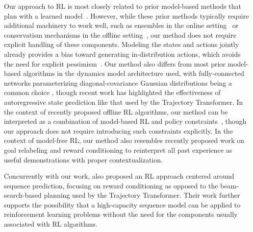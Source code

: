 Our approach to RL is most closely related to prior model-based methods that plan with a learned model~\citep{chua2018pets,wang2019exploring}.
However, while these prior methods typically require additional machinery to work well, such as ensembles in the online setting~\citep{kurutach2018model,buckman2018sample,malik2019calibrated} or conservatism mechanisms in the offline setting~\citep{yu2020mopo,kidambi2020morel,argenson2020model}, our method does not require explicit handling of these components.
Modeling the states and actions jointly already provides a bias toward generating in-distribution actions, which avoids the need for explicit pessimism~\citep{fujimoto2019off,kumar2019stabilizing,ghasemipour2020emaq,nair2020accelerating,jin2020pessimism,yin2021near,dadashi2021offline}.
Our method also differs from most prior model-based algorithms in the dynamics model architecture used, with fully-connected networks parameterizing diagonal-covariance Gaussian distributions being a common choice \citep{chua2018pets}, though recent work has highlighted the effectiveness of autoregressive state prediction \citep{zhang2021autoregressive} like that used by the Trajectory Transformer.
In the context of recently proposed offline RL algorithms, our method can be interpreted as a combination of model-based RL and policy constraints~\citep{kumar2019stabilizing,wu2019behavior}, though our approach does not require introducing such constraints explicitly.
In the context of model-free RL, our method also resembles recently proposed work on goal relabeling \citep{andrychowicz2017hindsight,rauber2017hindsight,ghosh2019gcsl,paster2021planning} and reward conditioning \citep{schmidhuber2019reinforcement,srivastava2019training,kumar2019reward} to reinterpret all past experience as useful demonstrations with proper contextualization.

Concurrently with our work, \citet{chen2021decision} also proposed an RL approach centered around sequence prediction, focusing on reward conditioning as opposed to the beam-search-based planning used by the Trajectory Transformer.
Their work further supports the possibility that a high-capacity sequence model can be applied to reinforcement learning problems without the need for the components usually associated with RL algorithms.
